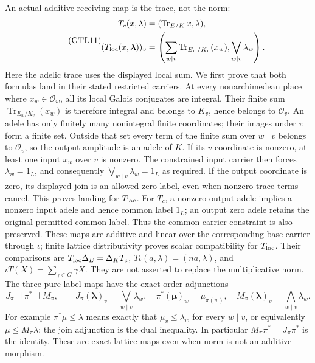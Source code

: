 An actual additive receiving map is the trace, not the norm:
\begin{equation}\tag{GTL11}
 \begin{aligned}
 T_c(x,\lambda)&=(\operatorname{Tr}_{E/K}x,\lambda),\\
 (T_{\rm loc}(x,\boldsymbol\lambda))_v
  &=\left(\sum_{w\mid v}\operatorname{Tr}_{E_w/K_v}(x_w),
                              \bigvee_{w\mid v}\lambda_w\right).
 \end{aligned}
\end{equation}
Here the adelic trace uses the displayed local sum. We first
prove that both formulas land in their stated restricted carriers.
At every nonarchimedean place where $x_w\in\mathcal O_w$, all
its local Galois conjugates are integral. Their finite sum
$\operatorname{Tr}_{E_w/K_v}(x_w)$ is therefore integral and
belongs to $K_v$, hence belongs to $\mathcal O_v$. An adele has
only finitely many nonintegral finite coordinates; their images
under $\pi$ form a finite set. Outside that set every term of
the finite sum over $w\mid v$ belongs to $\mathcal O_v$, so the
output amplitude is an adele of $K$.
If its $v$-coordinate is nonzero, at least one input $x_w$ over
$v$ is nonzero. The constrained input carrier then forces
$\lambda_w=1_L$, and consequently
$\bigvee_{w\mid v}\lambda_w=1_L$ as required. If the output
coordinate is zero, its displayed join is an allowed zero label,
even when nonzero trace terms cancel. This proves landing for
$T_{\rm loc}$. For $T_c$, a nonzero output adele implies a
nonzero input adele and hence common label $1_L$; an output
zero adele retains the original permitted common label. Thus
the common carrier constraint is also preserved.
These maps are additive and linear over the corresponding base carrier
through $\iota$; finite lattice distributivity proves scalar
compatibility for $T_{\rm loc}$. Their comparisons are
$T_{\rm loc}\Delta_E=\Delta_KT_c$,
$T\iota(a,\lambda)=(na,\lambda)$, and
$\iota T(X)=\sum_{\gamma\in G}\gamma X$.
They are not asserted to replace the multiplicative norm.
The three pure label maps have the exact order adjunctions
\begin{equation}\tag{GTL12}
 J_\pi\dashv\pi^*\dashv M_\pi,
 \qquad
 J_\pi(\boldsymbol\lambda)_v=\bigvee_{w\mid v}\lambda_w,
 \quad \pi^*(\boldsymbol\mu)_w=\mu_{\pi(w)},
 \quad M_\pi(\boldsymbol\lambda)_v=\bigwedge_{w\mid v}\lambda_w.
\end{equation}
For example $\pi^*\mu\le\lambda$ means exactly that
$\mu_v\le\lambda_w$ for every $w\mid v$, or equivalently
$\mu\le M_\pi\lambda$; the join adjunction is the dual
inequality. In particular $M_\pi\pi^*=J_\pi\pi^*$ is the
identity. These are exact lattice maps even when norm is not
an additive morphism.

